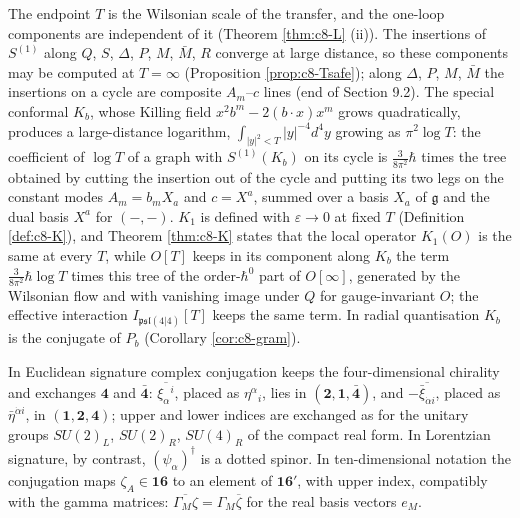 \begin{remark}
The endpoint $T$ is the Wilsonian scale of the transfer, and the one-loop components are independent of it (Theorem \ref{thm:c8-L} (ii)). The insertions of $S^{(1)}$ along $Q$, $S$, $\Delta$, $P$, $M$, $\bar M$, $R$ converge at large distance, so these components may be computed at $T=\infty$ (Proposition \ref{prop:c8-Tsafe}); along $\Delta$, $P$, $M$, $\bar M$ the insertions on a cycle are composite $A_m$--$c$ lines (end of Section 9.2). The special conformal $K_b$, whose Killing field $x^2b^m-2(b\cdot x)x^m$ grows quadratically, produces a large-distance logarithm, $\int_{|y|^2<T}|y|^{-4}d^4y$ growing as $\pi^2\log T$: the coefficient of $\log T$ of a graph with $S^{(1)}(K_b)$ on its cycle is $\tfrac3{8\pi^2}\hbar$ times the tree obtained by cutting the insertion out of the cycle and putting its two legs on the constant modes $A_m=b_mX_a$ and $c=X^a$, summed over a basis $X_a$ of $\mathfrak g$ and the dual basis $X^a$ for $(-,-)$. $K_1$ is defined with $\varepsilon\to0$ at fixed $T$ (Definition \ref{def:c8-K}), and Theorem \ref{thm:c8-K} states that the local operator $K_1(O)$ is the same at every $T$, while $O[T]$ keeps in its component along $K_b$ the term $\tfrac3{8\pi^2}\hbar\log T$ times this tree of the order-$\hbar^0$ part of $O[\infty]$, generated by the Wilsonian flow and with vanishing image under $Q$ for gauge-invariant $O$; the effective interaction $I_{\mathfrak{psl}(4|4)}[T]$ keeps the same term. In radial quantisation $K_b$ is the conjugate of $P_b$ (Corollary \ref{cor:c8-gram}).
\end{remark}

\begin{remark}
In Euclidean signature complex conjugation keeps the four-dimensional chirality and exchanges $\mathbf4$ and $\bar{\mathbf4}$: $\overline{\xi_\alpha{}^i}$, placed as $\eta^\alpha{}_i$, lies in $(\mathbf2,\mathbf1,\bar{\mathbf4})$, and $-\overline{\bar\xi_{\dot\alpha i}}$, placed as $\bar\eta^{\dot\alpha i}$, in $(\mathbf1,\mathbf2,\mathbf4)$; upper and lower indices are exchanged as for the unitary groups $SU(2)_L$, $SU(2)_R$, $SU(4)_R$ of the compact real form. In Lorentzian signature, by contrast, $(\psi_\alpha)^\dagger$ is a dotted spinor. In ten-dimensional notation the conjugation maps $\zeta_A\in\mathbf{16}$ to an element of $\mathbf{16}'$, with upper index, compatibly with the gamma matrices: $\overline{\Gamma_M\zeta}=\Gamma_M\overline\zeta$ for the real basis vectors $e_M$.
\end{remark}

